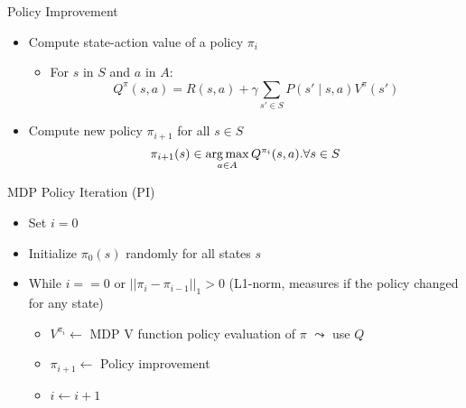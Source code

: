 \documentclass[aspectratio=169]{../latex_main/tntbeamer}  %
\begin{document}
\begin{frame}[c]{Policy Improvement}

\begin{itemize}
	\item Compute state-action value of a policy $\pi_i$
	\begin{itemize}
		\item For $s$ in $S$ and $a$ in $A$:
				$$Q^\pi(s,a) = R(s,a) + \gamma \sum_{s' \in S} P(s' \mid s,a) V^\pi(s')$$
	\end{itemize}
	\medskip
	\pause
	\item Compute new policy $\pi_{i+1}$ for all $s\in S$
	$$ \pi_{i+1}(s) \in \operatorname*{arg\,max}_{a\in A} Q^{\pi_i} (s,a). \forall s \in S $$
	

\end{itemize}

\end{frame}
\begin{frame}[c]{MDP Policy Iteration (PI)}

\begin{itemize}
	\item Set $i=0$
	\item Initialize $\pi_0(s)$ randomly for all states $s$
	\item While $i == 0$ or $||\pi_i - \pi_{i-1}||_1 > 0$ (L1-norm, measures if the policy changed for any state)
	\begin{itemize}
		\item $V^{\pi_i} \gets$ MDP V function policy \alert{evaluation} of $\pi$ \hspace{1em} $\leadsto$ use $Q$
		\item $\pi_{i+1} \gets$ Policy \alert{improvement}
		\item $i \gets i+1$
	\end{itemize}
\end{itemize}

\end{frame}
\end{document}

